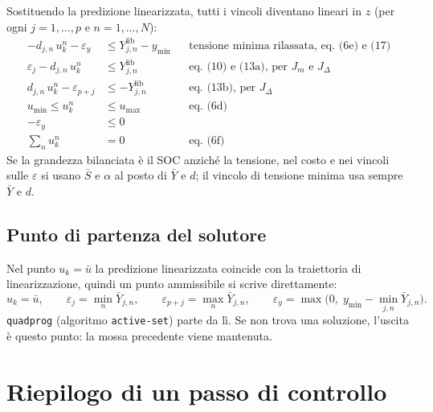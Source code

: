 \documentclass[11pt,a4paper]{article}
\newcommand{\lib}{\mathrm{lib}}
\begin{document}
Sostituendo la predizione linearizzata, tutti i vincoli diventano lineari in
$z$ (per ogni $j = 1,\dots,p$ e $n = 1,\dots,N$):
\begin{align}
  -d_{j,n}\,u^n_k - \varepsilon_y &\le Y^\lib_{j,n} - y_{\min}
     && \text{tensione minima rilassata, eq.~(6e) e (17)} \\
  \varepsilon_j - d_{j,n}\,u^n_k &\le Y^\lib_{j,n}
     && \text{eq.~(10) e (13a), per } J_m \text{ e } J_\Delta \\
  d_{j,n}\,u^n_k - \varepsilon_{p+j} &\le -Y^\lib_{j,n}
     && \text{eq.~(13b), per } J_\Delta \\
  u_{\min} \le u^n_k &\le u_{\max}
     && \text{eq.~(6d)} \\
  -\varepsilon_y &\le 0 \\
  \textstyle\sum_{n} u^n_k &= 0
     && \text{eq.~(6f)}
\end{align}
Se la grandezza bilanciata è il SOC anziché la tensione, nel costo e nei
vincoli sulle $\varepsilon$ si usano $\bar S$ e $\alpha$ al posto di $\bar Y$ e
$d$; il vincolo di tensione minima usa sempre $\bar Y$ e $d$.

\subsection{Punto di partenza del solutore}

Nel punto $u_k = \bar u$ la predizione linearizzata coincide con la traiettoria
di linearizzazione, quindi un punto ammissibile si scrive direttamente:
\[
  u_k = \bar u, \qquad
  \varepsilon_j = \min_n \bar Y_{j,n}, \qquad
  \varepsilon_{p+j} = \max_n \bar Y_{j,n}, \qquad
  \varepsilon_y = \max\bigl(0,\; y_{\min} - \min_{j,n} \bar Y_{j,n}\bigr).
\]
\texttt{quadprog} (algoritmo \texttt{active-set}) parte da lì. Se non trova una
soluzione, l'uscita è questo punto: la mossa precedente viene mantenuta.

\section{Riepilogo di un passo di controllo}\label{sec:riepilogo}
\end{document}
